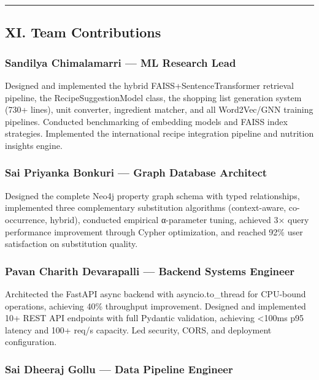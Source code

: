 \documentclass[
  10pt,
]{article}
\begin{document}
\begin{center}\rule{0.5\linewidth}{0.5pt}\end{center}

\subsection{XI. Team Contributions}\label{xi.-team-contributions}

\subsubsection{Sandilya Chimalamarri --- ML Research
Lead}\label{sandilya-chimalamarri-ml-research-lead}

Designed and implemented the hybrid FAISS+SentenceTransformer retrieval
pipeline, the RecipeSuggestionModel class, the shopping list generation
system (730+ lines), unit converter, ingredient matcher, and all
Word2Vec/GNN training pipelines. Conducted benchmarking of embedding
models and FAISS index strategies. Implemented the international recipe
integration pipeline and nutrition insights engine.

\subsubsection{Sai Priyanka Bonkuri --- Graph Database
Architect}\label{sai-priyanka-bonkuri-graph-database-architect}

Designed the complete Neo4j property graph schema with typed
relationships, implemented three complementary substitution algorithms
(context-aware, co-occurrence, hybrid), conducted empirical α-parameter
tuning, achieved 3× query performance improvement through Cypher
optimization, and reached 92\% user satisfaction on substitution
quality.

\subsubsection{Pavan Charith Devarapalli --- Backend Systems
Engineer}\label{pavan-charith-devarapalli-backend-systems-engineer}

Architected the FastAPI async backend with asyncio.to\_thread for
CPU-bound operations, achieving 40\% throughput improvement. Designed
and implemented 10+ REST API endpoints with full Pydantic validation,
achieving \textless100ms p95 latency and 100+ req/s capacity. Led
security, CORS, and deployment configuration.

\subsubsection{Sai Dheeraj Gollu --- Data Pipeline
Engineer}\label{sai-dheeraj-gollu-data-pipeline-engineer}
\end{document}
